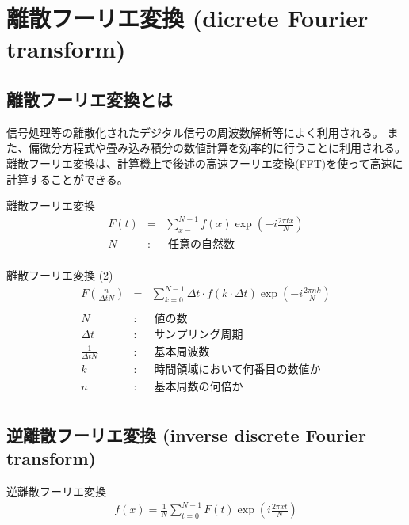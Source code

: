\documentclass[a4paper]{jsarticle}
\begin{document}
\section{離散フーリエ変換 (dicrete Fourier transform)}
\subsection{離散フーリエ変換とは}
信号処理等の離散化されたデジタル信号の周波数解析等によく利用される。
また、偏微分方程式や畳み込み積分の数値計算を効率的に行うことに利用される。
離散フーリエ変換は、計算機上で後述の高速フーリエ変換(FFT)を使って高速に計算することができる。
\begin{itembox}[l]{離散フーリエ変換}
    \begin{eqnarray*}
        F\left(t\right) &=& \sum^{N-1}_{x-} f\left(x\right) \exp \left(-i \frac{2\pi tx}{N}\right)\\
        N\; &:&\; 任意の自然数\\
    \end{eqnarray*}
\end{itembox}
\begin{itembox}[l]{離散フーリエ変換 (2)}
    \begin{eqnarray*}
        F\left(\frac{n}{\Delta t N}\right) &=& \sum^{N-1}_{k=0} \Delta t\cdot f\left(k\cdot \Delta t\right) \exp \left(-i \frac{2\pi nk}{N}\right)\\
        \\
        N\; &:&\; 値の数\\
        \Delta t \;&:&\; サンプリング周期\\
        \frac{1}{\Delta t N} \;&:&\; 基本周波数\\
        k \;&:&\; 時間領域において何番目の数値か\\
        n \;&:&\; 基本周数の何倍か\\
    \end{eqnarray*}
\end{itembox}

\subsection{逆離散フーリエ変換 (inverse discrete Fourier transform)}
\begin{itembox}[l]{逆離散フーリエ変換}
    \begin{eqnarray*}
        f\left(x\right) = \frac{1}{N}\sum ^{N-1}_{t=0} F\left(t\right) \exp \left(i\frac{2\pi xt}{N}\right)\\
    \end{eqnarray*}
\end{itembox}
\end{document}
